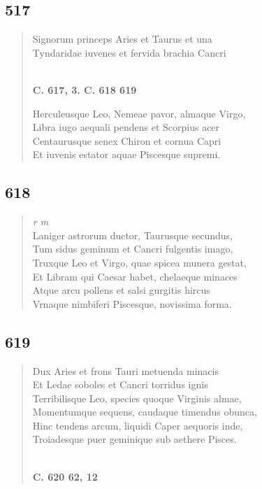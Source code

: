 \documentclass[11pt, a4paper]{report}
\begin{document}
            \subsection*{517}
      \begin{verse}
      Signorum princeps Aries et Taurus et una \\ Tyndaridae iuvenes et fervida brachia Cancri \\ 
        ﻿\pagebreak 
    \begin{center} \textbf{C. 617, 3. C. 618 619} \end{center} \marginpar{[92]} Herculeusque Leo, Nemeae pavor, almaque Virgo, \\ Libra iugo aequali pendens et Scorpius acer \\ Centaurusque senex Chiron et cornua Capri \\ Et iuvenis estator aquae Piscesque supremi. \\ 
      \end{verse}
  
            \subsection*{618}
      \begin{verse}
      \textit{r m} \\ Laniger astrorum ductor, Taurusque secundus, \\ Tum sidus geminum et Cancri fulgentis imago, \\ Truxque Leo et Virgo, quae spicea munera gestat, \\ Et Libram qui Caesar habet, chelaeque minaces \\ Atque arcu pollens et salsi gurgitis hircus \\ Vrnaque nimbiferi Piscesque, novissima forma. \\ 
      \end{verse}
  
            \subsection*{619}
      \begin{verse}
      Dux Aries et frons Tauri metuenda minacis \\ Et Ledae soboles et Cancri torridus ignis \\ Terribilisque Leo, species quoque Virginis almae, \\ Momentumque sequens, caudaque timendus obunca, \\ Hinc tendens arcum, liquidi Caper aequoris inde, \\ Troiadesque puer geminique sub aethere Pisces. \\ 
        ﻿\pagebreak 
    \begin{center} \textbf{C. 620 62, 12} \end{center} \marginpar{[93]} 
      \end{verse}
  
\end{document}
